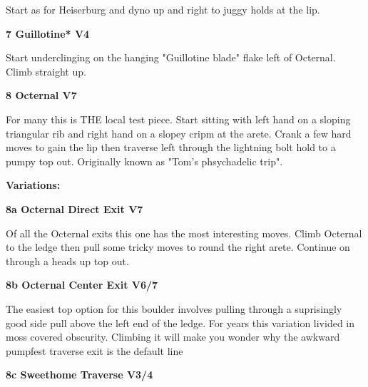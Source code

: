 \begin{multicols}{2}
\begin{adjustwidth}{0.5cm}{}
							\begin{adjustwidth}{0.5cm}{}				
							Start as for Heiserburg and dyno up and right to juggy holds at the lip.
							\end{adjustwidth}
						\end{adjustwidth}
					\label{rt:Guillotine}
\colorbox{RoyalBlue!20}{
\parbox{0.95\linewidth}{
\textbf{
7 Guillotine* V4  
}
}
}

					\begin{adjustwidth}{0.5cm}{}				
					Start underclinging on the hanging "Guillotine blade" flake left of Octernal. Climb straight up.
					\end{adjustwidth}
					\label{rt:Octernal}
\colorbox{Goldenrod!50}{
\parbox{0.95\linewidth}{
\textbf{
8 Octernal V7  
}
}
}

					\begin{adjustwidth}{0.5cm}{}				
					For many this is THE local test piece. Start sitting with left hand on a sloping triangular rib and right hand on a slopey cripm at the arete. Crank a few hard moves to gain the lip then traverse left through the lightning bolt hold to a pumpy top out. Originally known as "Tom's phsychadelic trip".
					\end{adjustwidth}
						\begin{adjustwidth}{0.5cm}{}				
						\textbf{Variations:} \newline
							\label{vr:Octernal Direct Exit}
\colorbox{Goldenrod!50}{
\parbox{0.95\linewidth}{
\textbf{
8a Octernal Direct Exit V7  
}
}
}

							\begin{adjustwidth}{0.5cm}{}				
							Of all the Octernal exits this one has the most interesting moves. Climb Octernal to the ledge then pull some tricky moves to round the right arete. Continue on through a heads up top out.
							\end{adjustwidth}
							\label{vr:Octernal Center Exit}
\colorbox{Goldenrod!50}{
\parbox{0.95\linewidth}{
\textbf{
8b Octernal Center Exit V6/7  
}
}
}

							\begin{adjustwidth}{0.5cm}{}				
							The easiest top option for this boulder involves pulling through a suprisingly good side pull above the left end of the ledge. For years this variation livided in moss covered obscurity. Climbing it will make you wonder why the awkward pumpfest traverse exit is the default line
							\end{adjustwidth}
							\label{vr:Sweethome Traverse}
\colorbox{RoyalBlue!20}{
\parbox{0.95\linewidth}{
\textbf{
8c Sweethome Traverse V3/4  
}
}
}


\end{adjustwidth}
\end{multicols}
